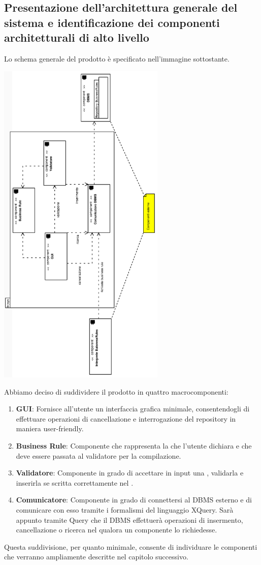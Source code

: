 \documentclass[11pt,titlepage,a4paper]{report}
\begin{document}
\subsection{Presentazione dell'architettura generale del sistema e identificazione dei componenti architetturali di alto livello}
Lo schema generale del prodotto \`e specificato nell'immagine sottostante.
\begin{center}
\includegraphics[width=0.6\textwidth, angle=-90]{DiagrammaClassi/schemagenerale.eps}
\end{center}
Abbiamo deciso di suddividere il prodotto in quattro macrocomponenti:
\begin{enumerate}
 \item \textbf{GUI}: Fornisce all'utente un interfaccia grafica minimale, consentendogli di effettuare operazioni di cancellazione e interrogazione del repository in maniera user-friendly.
\item \textbf{Business Rule}: Componente che rappresenta la \br che l'utente dichiara e che deve essere passata al validatore per la compilazione.
\item \textbf{Validatore}: Componente in grado di accettare in input una \br, validarla e inserirla se scritta correttamente nel \re.
\item \textbf{Comunicatore}: Componente in grado di connettersi al DBMS esterno e di comunicare con esso tramite i formalismi del linguaggio XQuery.
Sar\`a appunto tramite Query che il DBMS effettuer\`a operazioni di insermento, cancellazione o ricerca nel \re qualora un componente lo richiedesse.
\end{enumerate}
Questa suddivisione, per quanto minimale, consente di individuare le componenti che verranno ampliamente descritte nel capitolo successivo.
\end{document}
